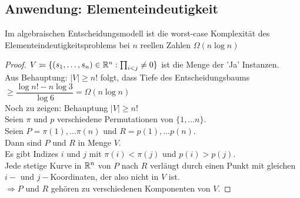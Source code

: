 \subsection{Anwendung: Elementeindeutigkeit}
\begin{satz}
Im algebraischen Entscheidungsmodell ist die worst-case Komplexität des Elementeindeutigkeitsproblems bei $n$ reellen Zahlen $\Omega(n\log n)$
\end{satz}
\begin{proof}
$V :\!= \{(s_1,\ldots,s_n) \in \mathbb{R}^n : \prod_{i < j} \ne 0 \}$ ist die Menge der 'Ja' Instanzen.\\
Aus Behauptung: $\lvert V \rvert \geq n!$ folgt, dass Tiefe des Entscheidungsbaums $\geq \dfrac{\log n! - n \log 3}{\log 6} = \Omega(n \log n)$\\
Noch zu zeigen: Behauptung $\lvert V \rvert \geq n!$\\
Seien $\pi$ und $p$ verschiedene Permutationen von $\{1,\ldots n \}.$\\
Seien $P = \pi(1),\ldots \pi(n)$ und $R = p(1), \ldots p(n)$.\\
Dann sind $P$ und $R$ in Menge $V$.\\
Es gibt Indizes $i$ und $j$ mit $\pi(i) < \pi(j)$ und $p(i) > p(j)$.\\
Jede stetige Kurve in $\mathbb{R}^n$ von $P$ nach $R$ verläugt durch einen Punkt mit gleichen $i-$ und $j-$Koordinaten, der also nicht in $V$ ist.\\
$\Rightarrow P$ und $R$ gehören zu verschiedenen Komponenten von $V$.
\end{proof}